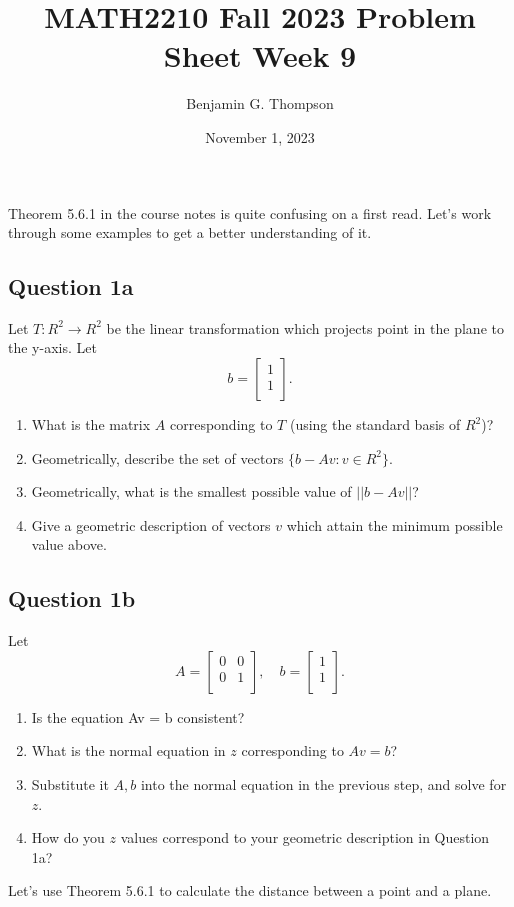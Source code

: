 \documentclass[12pt, a4paper]{article}
\title{MATH2210 Fall 2023 Problem Sheet Week 9}
\author{Benjamin G. Thompson}
\date{November 1, 2023}
\begin{document}
Theorem 5.6.1 in the course notes is quite confusing on a first read. Let's work through some examples to get a better understanding of it.
\subsection*{Question 1a}
Let $T : R^2 \rightarrow R^2$ be the linear transformation which projects point in the plane to the y-axis. Let
\[
b = \begin{bmatrix}
  1 \\
  1 \\
  \end{bmatrix}.
\]

\begin{enumerate}
\item What is the matrix $A$ corresponding to $T$ (using the standard basis of $R^2$)?
\item Geometrically, describe the set of vectors $\{ b - Av : v \in R^2\}$.
\item Geometrically, what is the smallest possible value of $||b - Av||$?
  \item Give a geometric description of vectors $v$ which attain the minimum possible value above.
\end{enumerate}

\subsection*{Question 1b}
Let
\[
A = \begin{bmatrix}
  0 & 0 \\
  0 & 1 \\
  \end{bmatrix}, \quad 
b = \begin{bmatrix}
  1 \\
  1 \\
  \end{bmatrix}.
\]
\begin{enumerate}
\item Is the equation Av = b consistent?
\item What is the normal equation in $z$ corresponding to $Av = b$?
\item Substitute it $A, b$ into the normal equation in the previous step, and solve for $z$.
  \item How do you $z$ values correspond to your geometric description in Question 1a?
\end{enumerate}

Let's use Theorem 5.6.1 to calculate the distance between a point and a plane.
\end{document}
